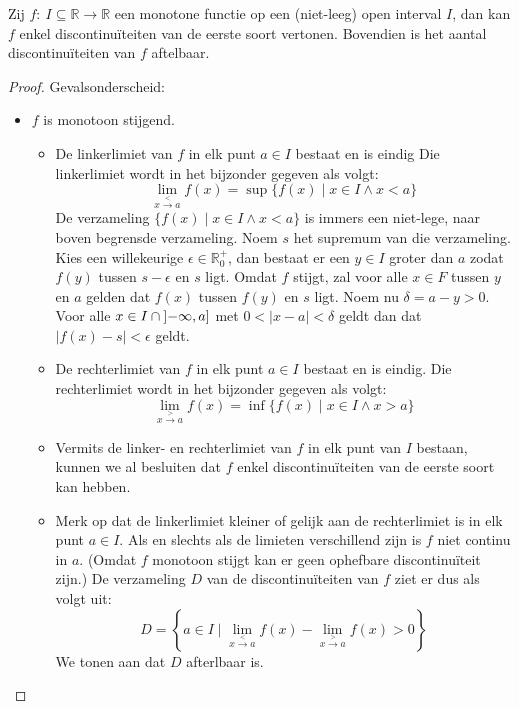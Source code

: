 \documentclass[main.tex]{subfiles}
\begin{document}
\begin{pr}
  Zij $f:\ I \subseteq \mathbb{R} \rightarrow \mathbb{R}$ een monotone functie op een (niet-leeg) open interval $I$, dan kan $f$ enkel discontinu\"iteiten van de eerste soort vertonen.
  Bovendien is het aantal discontinu\"iteiten van $f$ aftelbaar.

  \begin{proof}
    Gevalsonderscheid:
    \begin{itemize}
    \item $f$ is monotoon stijgend.
      \begin{itemize}
      \item De linkerlimiet van $f$ in elk punt $a\in I$ bestaat en is eindig
        Die linkerlimiet wordt in het bijzonder gegeven als volgt:
        \[ \lim_{x \overset{<}{\rightarrow} a}f(x) = \sup\{ f(x)\mid x\in I \wedge x < a \} \]
        De verzameling $\{ f(x)\mid x\in I \wedge x < a \}$ is immers een niet-lege, naar boven begrensde verzameling.
        Noem $s$ het supremum van die verzameling.
        Kies een willekeurige $\epsilon \in \mathbb{R}_{0}^{+}$, dan
        bestaat er een $y\in I$ groter dan $a$ zodat $f(y)$ tussen
        $s-\epsilon$ en $s$ ligt.  Omdat $f$ stijgt, zal voor alle
        $x\in F$ tussen $y$ en $a$ gelden dat $f(x)$ tussen $f(y)$ en
        $s$ ligt.  Noem nu $\delta = a-y > 0$.  Voor alle
        $x\in I\cap\interval[open left]{-\infty}{a}$ met
        $0<|x-a|<\delta$ geldt dan dat $|f(x)-s|<\epsilon$ geldt.
      \item De rechterlimiet van $f$ in elk punt $a\in I$ bestaat en is eindig.
        Die rechterlimiet wordt in het bijzonder gegeven als volgt:
        \[ \lim_{x \overset{>}{\rightarrow} a}f(x) = \inf\{ f(x)\mid x\in I \wedge x > a \} \]
      \item Vermits de linker- en rechterlimiet van $f$ in elk punt van $I$ bestaan, kunnen we al besluiten dat $f$ enkel discontinu\"iteiten van de eerste soort kan hebben.
      \item Merk op dat de linkerlimiet kleiner of gelijk aan de rechterlimiet is in elk punt $a\in I$.
        Als en slechts als de limieten verschillend zijn is $f$ niet continu in $a$.
        (Omdat $f$ monotoon stijgt kan er geen ophefbare discontinu\"iteit zijn.)
        De verzameling $D$ van de discontinu\"iteiten van $f$ ziet er dus als volgt uit:
        \[ D = \left\{ a \in I \mid \lim_{x \overset{<}{\rightarrow} a}f(x)- \lim_{x \overset{>}{\rightarrow} a}f(x) > 0 \right\} \]
        We tonen aan dat $D$ afterlbaar is.\\

\end{itemize}
\end{itemize}
\end{proof}
\end{pr}
\end{document}
